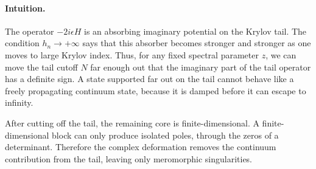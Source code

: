 \documentclass[JHEP,12pt]{article}
\begin{document}
\paragraph{Intuition.}
The operator \(-2i\epsilon H\) is an absorbing imaginary potential on the
Krylov tail. The condition \(h_n\to+\infty\) says that this absorber becomes
stronger and stronger as one moves to large Krylov index. Thus, for any fixed
spectral parameter \(z\), we can move the tail cutoff \(N\) far enough out that
the imaginary part of the tail operator has a definite sign. A state supported
far out on the tail cannot behave like a freely propagating continuum state,
because it is damped before it can escape to infinity.

After cutting off the tail, the remaining core is finite-dimensional. A
finite-dimensional block can only produce isolated poles, through the zeros of
a determinant. Therefore the complex deformation removes the continuum
contribution from the tail, leaving only meromorphic singularities.
\end{document}
